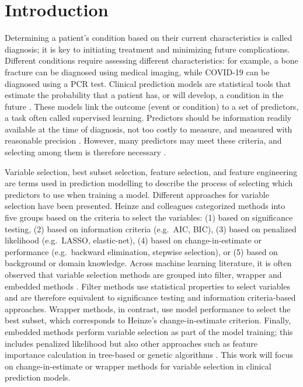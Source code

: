 \newpage

\section{Introduction}

Determining a patient's condition based on their current characteristics is called diagnosis; it is key to initiating treatment and minimizing future complications. Different conditions require assessing different characteristics: for example, a bone fracture can be diagnosed using medical imaging, while COVID-19 can be diagnosed using a PCR test. Clinical prediction models are statistical tools that estimate the probability that a patient has, or will develop, a condition in the future \cite{steyerberg2019clinical,jamesIntroductionStatisticalLearning2021}. These models link the outcome (event or condition) to a set of predictors, a task often called supervised learning. Predictors should be information readily available at the time of diagnosis, not too costly to measure, and measured with reasonable precision \cite{steyerberg2019clinical}. However, many predictors may meet these criteria, and selecting among them is therefore necessary \cite{chowdhuryVariableSelectionStrategies2020}.

Variable selection, best subset selection, feature selection, and feature engineering are terms used in prediction modelling to describe the process of selecting which predictors to use when training a model. Different approaches for variable selection have been presented. Heinze and colleagues \cite{heinzeVariableSelectionReview2018} categorized methods into five groups based on the criteria to select the variables: (1) based on significance testing, (2) based on information criteria (e.g.\ AIC, BIC), (3) based on penalized likelihood (e.g.\ LASSO, elastic-net), (4) based on change-in-estimate or performance (e.g.\ backward elimination, stepwise selection), or (5) based on background or domain knowledge. Across machine learning literature, it is often observed that variable selection methods are grouped into filter, wrapper and embedded methods \cite{Nguyen2025Vol1}. Filter methods use statistical properties to select variables and are therefore equivalent to significance testing and information criteria-based approaches. Wrapper methods, in contrast, use model performance to select the best subset, which corresponds to Heinze's change-in-estimate criterion. Finally, embedded methods perform variable selection as part of the model training; this includes penalized likelihood but also other approaches such as feature importance calculation in tree-based or genetic algorithms \cite{archerEmpiricalCharacterizationRandom2008,zhangVariableSelectionLogistic2018}. This work will focus on change-in-estimate or wrapper methods for variable selection in clinical prediction models.

